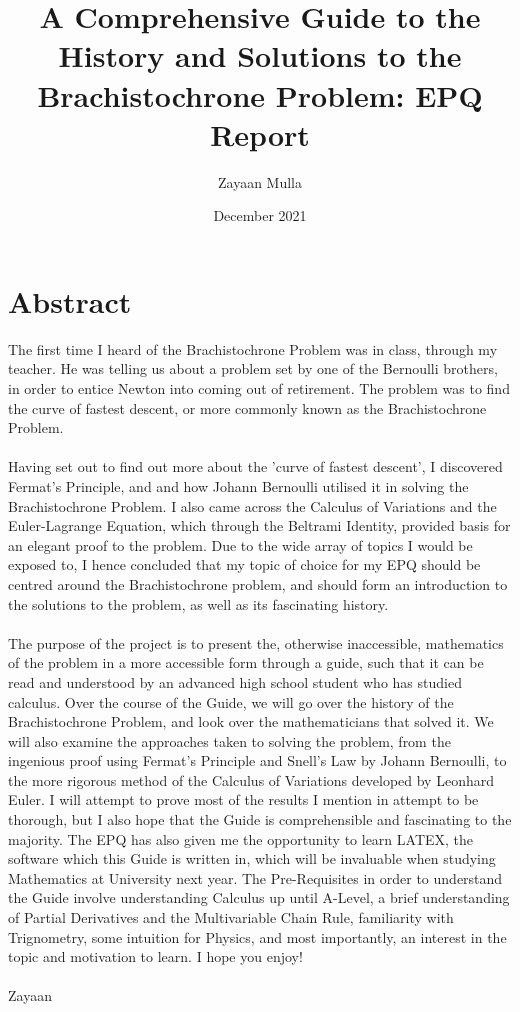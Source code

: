 \documentclass[12pt]{report}
\title{A Comprehensive Guide to the History and Solutions to the Brachistochrone Problem: EPQ Report}
\author{Zayaan Mulla}
\date{December 2021}
\begin{document}
\maketitle

\tableofcontents
\chapter{Abstract}
The first time I heard of the Brachistochrone Problem was in class, through my teacher. He was telling us about a problem set by one of the Bernoulli brothers, in order to entice Newton into coming out of retirement. The problem was to find the curve of fastest descent, or more commonly known as the Brachistochrone Problem.
\\
\\
Having set out to find out more about the 'curve of fastest descent', I discovered Fermat's Principle, and and how Johann Bernoulli utilised it in solving the Brachistochrone Problem. I also came across the Calculus of Variations and the Euler-Lagrange Equation, which through the Beltrami Identity, provided basis for an elegant proof to the problem. Due to the wide array of topics I would be exposed to, I hence concluded that my topic of choice for my EPQ should be centred around the Brachistochrone problem, and should form an introduction to the solutions to the problem, as well as its fascinating history.
\\
\\
The purpose of the project is to present the, otherwise inaccessible, mathematics of the problem in a more accessible form through a guide, such that it can be read and understood by an advanced high school student who has studied calculus. Over the course of the Guide, we will go over the history of the Brachistochrone Problem, and look over the mathematicians that solved it. We will also examine the approaches taken to solving the problem, from the ingenious proof using Fermat's Principle and Snell's Law by Johann Bernoulli, to the more rigorous method of the Calculus of Variations developed by Leonhard Euler. I will attempt to prove most of the results I mention in attempt to be thorough, but I also hope that the Guide is comprehensible and fascinating to the majority. The EPQ has also given me the opportunity to learn LATEX, the software which this Guide is written in, which will be invaluable when studying Mathematics at University next year. The Pre-Requisites in order to understand the Guide involve understanding Calculus up until A-Level, a brief understanding of Partial Derivatives and the Multivariable Chain Rule, familiarity with Trignometry, some intuition for Physics, and most importantly, an interest in the topic and motivation to learn. I hope you enjoy!
\\
\\
Zayaan
\end{document}
